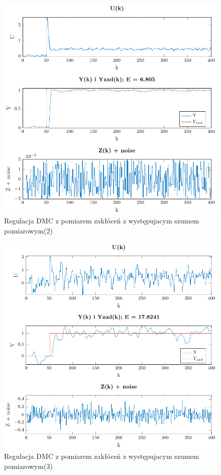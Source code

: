 \documentclass[a4paper,titlepage,11pt,twosides,floatssmall]{mwrep}
\begin{document}
\begin{figure}[H]
	\centering
	\includegraphics{../../Lab2/PDF_rysunki/Z7_Szum2.pdf}
	\caption{Regulacja DMC z pomiarem zakłóceń z występujacym szumem pomiarowym(2)}
	\label{szum2}
\end{figure}


\begin{figure}[H]
	\centering
	\includegraphics{../../Lab2/PDF_rysunki/Z7_Szum3.pdf}
	\caption{Regulacja DMC z pomiarem zakłóceń z występujacym szumem pomiarowym(3)}
	\label{szum3}
\end{figure}
\end{document}

